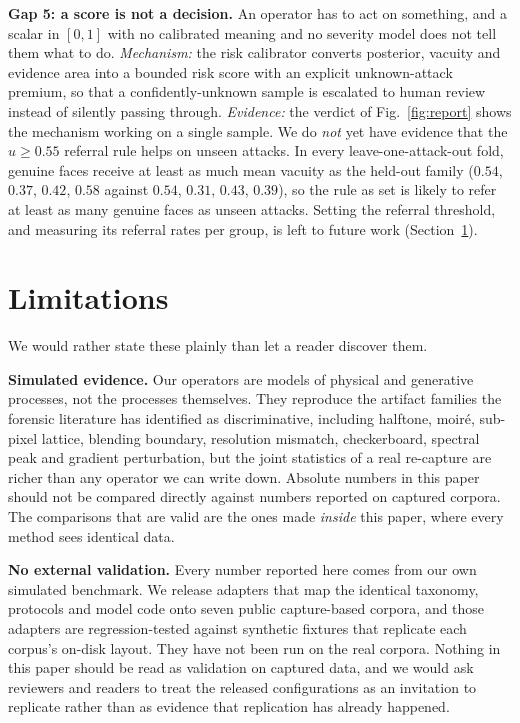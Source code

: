 \documentclass[conference]{IEEEtran}
\begin{document}
\textbf{Gap 5: a score is not a decision.} An operator has to act on something, and a
scalar in $[0,1]$ with no calibrated meaning and no severity model does not tell them
what to do. \emph{Mechanism:} the risk calibrator converts posterior, vacuity and
evidence area into a bounded risk score with an explicit unknown-attack premium, so
that a confidently-unknown sample is escalated to human review instead of silently
passing through. \emph{Evidence:} the verdict of Fig.~\ref{fig:report} shows the
mechanism working on a single sample. We do \emph{not} yet have evidence that the
$u\ge0.55$ referral rule helps on unseen attacks. In every leave-one-attack-out
fold, genuine faces receive at least as much mean vacuity as the held-out family
($0.54$, $0.37$, $0.42$, $0.58$ against $0.54$, $0.31$, $0.43$, $0.39$), so the rule
as set is likely to refer at least as many genuine faces as unseen attacks. Setting
the referral threshold, and measuring its referral rates per group, is left to
future work (Section~\ref{sec:limits}).

\section{Limitations}\label{sec:limits}
We would rather state these plainly than let a reader discover them.

\textbf{Simulated evidence.} Our operators are models of physical and generative
processes, not the processes themselves. They reproduce the artifact families the
forensic literature has identified as discriminative, including halftone, moir\'e,
sub-pixel lattice, blending boundary, resolution mismatch, checkerboard, spectral
peak and gradient perturbation, but the joint statistics of a real re-capture are
richer than any operator we can write down. Absolute numbers in this paper should not
be compared directly against numbers reported on captured corpora. The comparisons
that are valid are the ones made \emph{inside} this paper, where every method sees
identical data.

\textbf{No external validation.} Every number reported here comes from our own
simulated benchmark. We release adapters that map the identical taxonomy, protocols
and model code onto seven public capture-based corpora, and those adapters are
regression-tested against synthetic fixtures that replicate each corpus's on-disk
layout. They have not been run on the real corpora. Nothing in this paper should be
read as validation on captured data, and we would ask reviewers and readers to treat
the released configurations as an invitation to replicate rather than as evidence
that replication has already happened.
\end{document}
